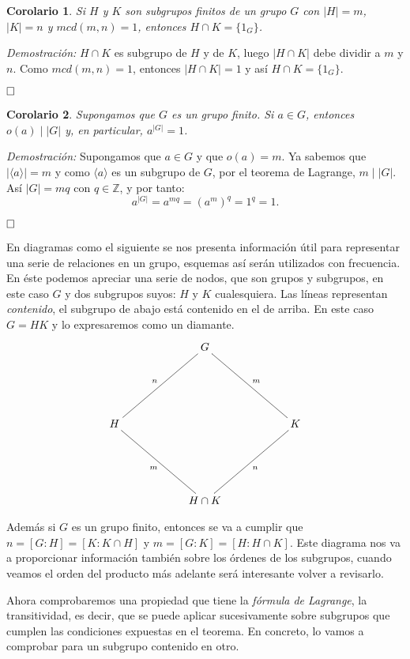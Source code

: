 \documentclass[12pt]{article}
\newtheorem{corolario}{Corolario}[theorem]
\begin{document}
\begin{corolario}Si $H$ y $K$ son subgrupos finitos de un grupo $G$ con $|H| = m$, $|K| = n$ y $mcd(m,n) = 1$, entonces $H\cap K = \lbrace 1_{G} \rbrace $.
\end{corolario}
\emph{Demostración: }$H\cap K$ es subgrupo de $H$ y de $K$, luego $|H\cap K|$ debe dividir a $m$ y $n$. Como $mcd(m,n) = 1$, entonces $|H \cap K| = 1$ y así $H \cap K = \lbrace 1_{G} \rbrace$.

$\hfill \square$
\begin{corolario}Supongamos que $G$ es un grupo finito. Si $a \in G$, entonces $o(a)\mid |G|$ y, en particular, $a^{|G|} = 1$.
\end{corolario}
\emph{Demostración: }Supongamos que $a \in G$ y que $o(a) = m$. Ya sabemos que $|\langle a \rangle | = m$ y como $\langle a \rangle $ es un subgrupo de $G$, por el teorema de Lagrange, $m \mid |G|$. Así $|G| = mq$ con $q \in \mathbb{Z}$, y por tanto: $$a^{|G|} = a^{mq} = (a^{m})^{q} = 1^{q} = 1.$$

$\hfill \square$

En diagramas como el siguiente se nos presenta información útil para representar una serie de relaciones en un grupo, esquemas así serán utilizados con frecuencia. En éste podemos apreciar una serie de nodos, que son grupos y subgrupos, en este caso $G$ y dos subgrupos suyos: $H$ y $K$ cualesquiera. Las líneas representan \textit{contenido}, el subgrupo de abajo está contenido en el de arriba. En este caso $G=HK$ y lo expresaremos como un diamante. 
$$\xymatrix @=2cm {&G \ar@{-}[ld]_n \ar@{-}[rd]^m  \\ H \ar@{-}[rd]_m & & K \ar@{-}[ld]^n \\ &H \cap K }$$

Además si $G$ es un grupo finito, entonces se va a cumplir que $n= [G:H] = [K: K \cap H]$ y $m= [G:K] = [H : H \cap K]$. Este diagrama nos va a proporcionar información también sobre los órdenes de los subgrupos, cuando veamos el orden del producto más adelante será interesante volver a revisarlo.

Ahora comprobaremos una propiedad que tiene la \textit{fórmula de Lagrange}, la transitividad, es decir, que se puede aplicar sucesivamente sobre subgrupos que cumplen las condiciones expuestas en el teorema. En concreto, lo vamos a comprobar para un subgrupo contenido en otro.
\end{document}
